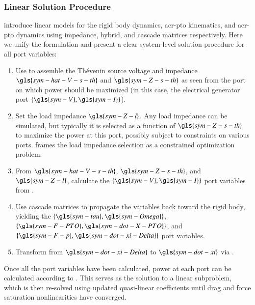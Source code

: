 \subsubsection{Linear Solution Procedure}
\label{sec:appendix-dynamics-solution}
 introduce linear models for the rigid body dynamics, \gls{acr-pto} kinematics, and \gls{acr-pto} dynamics
using impedance, hybrid, and cascade matrices respectively.
Here we unify the formulation and present a clear system-level solution procedure for all port variables:
\begin{enumerate}
    \item Use  to assemble the Th\'{e}venin source voltage and impedance
        $\gls{sym-hat-V-s-th}$ and $\gls{sym-Z-s-th}$
        as seen from the port on which power should be maximized
        (in this case, the electrical generator port
        $\{\gls{sym-V},\gls{sym-I}\}$).
    \item Set the load impedance $\gls{sym-Z-l}$.
        Any load impedance can be simulated,
        but typically it is selected as a function of $\gls{sym-Z-s-th}$ to maximize the power at this port,
        possibly subject to constraints on various ports.
         frames the load impedance selection as a constrained optimization problem.
    \item From  $\gls{sym-hat-V-s-th}$, $\gls{sym-Z-s-th}$, and $\gls{sym-Z-l}$,
        calculate the $\{\gls{sym-V},\gls{sym-I}\}$ port variables from .
    \item Use cascade matrices 
        to propagate the variables back toward the rigid body,
        yielding the $\{\gls{sym-tau},\gls{sym-Omega}\}$, $\{\gls{sym-F-PTO},\gls{sym-dot-X-PTO}\}$,
        and $\{\gls{sym-F-p}, \gls{sym-dot-xi-Delta}\}$ port variables.
    \item Transform from $\gls{sym-dot-xi-Delta}$ to $\gls{sym-dot-xi}$ via .
\end{enumerate}
Once all the port variables have been calculated,
power at each port can be calculated according to .
This serves as the solution to a linear subproblem,
which is then re-solved using updated quasi-linear coefficients until drag and force saturation nonlinearities have converged.
